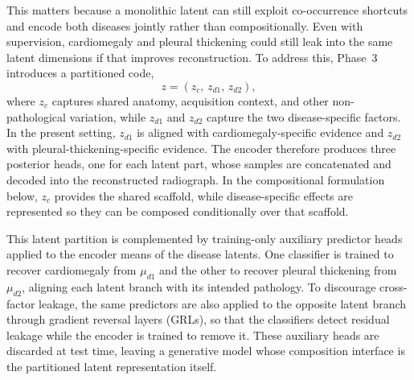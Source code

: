 This matters because a monolithic latent can still exploit co-occurrence shortcuts and encode both diseases jointly rather than compositionally. Even with supervision, cardiomegaly and pleural thickening could still leak into the same latent dimensions if that improves reconstruction. To address this, Phase~3 introduces a partitioned code,
\begin{equation}
    z = (z_c,\, z_{d1},\, z_{d2}),
\end{equation}
where $z_c$ captures shared anatomy, acquisition context, and other non-pathological variation, while $z_{d1}$ and $z_{d2}$ capture the two disease-specific factors. In the present setting, $z_{d1}$ is aligned with cardiomegaly-specific evidence and $z_{d2}$ with pleural-thickening-specific evidence. The encoder therefore produces three posterior heads, one for each latent part, whose samples are concatenated and decoded into the reconstructed radiograph. In the compositional formulation below, \(z_c\) provides the shared scaffold, while disease-specific effects are represented so they can be composed conditionally over that scaffold.

This latent partition is complemented by training-only auxiliary predictor heads applied to the encoder means of the disease latents. One classifier is trained to recover cardiomegaly from $\mu_{d1}$ and the other to recover pleural thickening from $\mu_{d2}$, aligning each latent branch with its intended pathology. To discourage cross-factor leakage, the same predictors are also applied to the opposite latent branch through gradient reversal layers (GRLs), so that the classifiers detect residual leakage while the encoder is trained to remove it. These auxiliary heads are discarded at test time, leaving a generative model whose composition interface is the partitioned latent representation itself.

